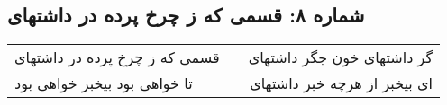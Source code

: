 \begin{center}
\section*{شماره ۸: قسمی که ز چرخ پرده در داشتهای}
\label{sec:008}
\begin{longtable}{l p{0.5cm} r}
قسمی که ز چرخ پرده در داشتهای
&&
گر داشتهای خون جگر داشتهای
\\
تا خواهی بود بیخبر خواهی بود
&&
ای بیخبر از هرچه خبر داشتهای
\\
\end{longtable}
\end{center}
